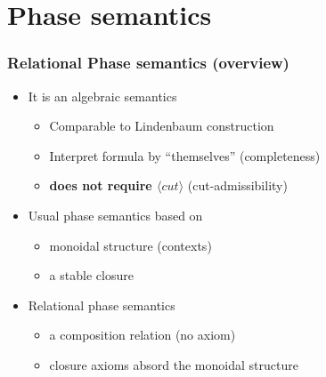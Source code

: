 \documentclass[xcolor=pdftex,graphicx=pdftex,12pt]{beamer}
\renewcommand\frule[1]{\ensuremath{\langle#1\rangle}}
\begin{document}
\section{Phase semantics}

\begin{frame}

\frametitle{Relational Phase semantics (overview)}

\begin{itemize}
\item It is an algebraic semantics
  \begin{itemize}
  \item Comparable to Lindenbaum construction
  \item Interpret formula by ``themselves'' (completeness)
  \item {\bf does not require \frule{cut}} (cut-admissibility)
  \end{itemize}
\item Usual phase semantics based on
  \begin{itemize}
  \item monoidal structure (contexts)
  \item a stable closure
  \end{itemize}
\item Relational phase semantics
  \begin{itemize}
  \item a composition relation (no axiom)
  \item closure axioms absord the monoidal structure
  \end{itemize}
\end{itemize}

\end{frame}
\end{document}
